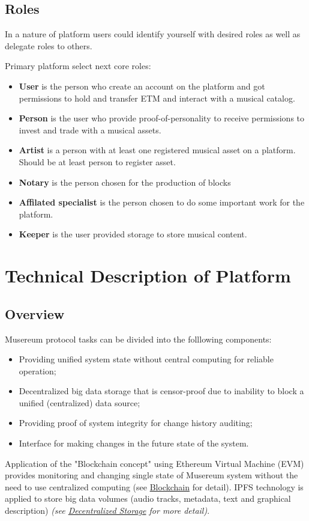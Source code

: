 \documentclass[12pt]{report}
\begin{document}
\section{Roles}
\label{platform-roles}
In a nature of platform users could identify yourself with desired roles as well as delegate roles to others.

Primary platform select next core roles:
\begin{itemize}
	\item \textbf{User} is the person who create an account on the platform and got permissions to hold and transfer ETM and interact with a musical catalog.
	\item \textbf{Person} is the user who provide proof-of-personality to receive permissions to invest and trade with a musical assets.
	\item \textbf{Artist} is a person with at least one registered musical asset on a platform. Should be at least person to register asset.
	\item \textbf{Notary} is the person chosen for the production of blocks
	\item \textbf{Affilated specialist} is the person chosen to do some important work for the platform. 
	\item \textbf{Keeper} is the user provided storage to store musical content.
\end{itemize}

\chapter{Technical Description of Platform}
\section{Overview}
\label{tech-review}
Musereum protocol tasks can be divided into the folllowing components:
\begin{itemize}
\item Providing unified system state without central computing for reliable operation;
\item Decentralized big data storage that is censor-proof due to inability to block a unified (centralized) data source;
\item Providing proof of system integrity for change history auditing;
\item Interface for making changes in the future state of the system.
\end{itemize}
Application of the "Blockchain concept" using Ethereum Virtual Machine (EVM) provides monitoring and changing single state of Musereum system without the need to use centralized computing (see \hyperref[tech-blockchain]{Blockchain} for detail). IPFS technology is applied to store big data volumes (audio tracks, metadata, text and graphical description) \textit{(see \hyperref[tech-storage]{Decentralized Storage} for more detail)}.
\end{document}
